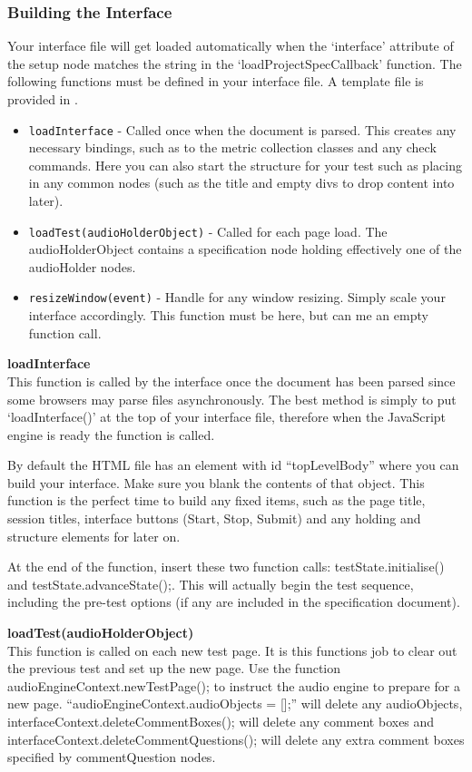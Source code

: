 \documentclass[11pt, oneside]{article}   	%
\begin{document}
		\subsubsection{Building the Interface}
			Your interface file will get loaded automatically when the `interface' attribute of the setup node matches the string in the `loadProjectSpecCallback' function. The following functions must be defined in your interface file. A template file is provided in .	
			\begin{itemize}
				\item \texttt{loadInterface} - Called once when the document is parsed. This creates any necessary bindings, such as to the metric collection classes and any check commands. Here you can also start the structure for your test such as placing in any common nodes (such as the title and empty divs to drop content into later).
				\item \texttt{loadTest(audioHolderObject)} - Called for each page load. The audioHolderObject contains a specification node holding effectively one of the audioHolder nodes.
				\item \texttt{resizeWindow(event)} - Handle for any window resizing. Simply scale your interface accordingly. This function must be here, but can me an empty function call.
			\end{itemize}

			\textbf{loadInterface}\\
				This function is called by the interface once the document has been parsed since some browsers may parse files asynchronously. The best method is simply to put `loadInterface()' at the top of your interface file, therefore when the JavaScript engine is ready the function is called.

				By default the HTML file has an element with id ``topLevelBody'' where you can build your interface. Make sure you blank the contents of that object. This function is the perfect time to build any fixed items, such as the page title, session titles, interface buttons (Start, Stop, Submit) and any holding and structure elements for later on.

				At the end of the function, insert these two function calls: testState.initialise() and testState.advanceState();. This will actually begin the test sequence, including the pre-test options (if any are included in the specification document).

			\textbf{loadTest(audioHolderObject)}\\
				This function is called on each new test page. It is this functions job to clear out the previous test and set up the new page. Use the function audioEngineContext.newTestPage(); to instruct the audio engine to prepare for a new page. ``audioEngineContext.audioObjects = [];'' will delete any audioObjects, interfaceContext.deleteCommentBoxes(); will delete any comment boxes and interfaceContext.deleteCommentQuestions(); will delete any extra comment boxes specified by commentQuestion nodes.
\end{document}
